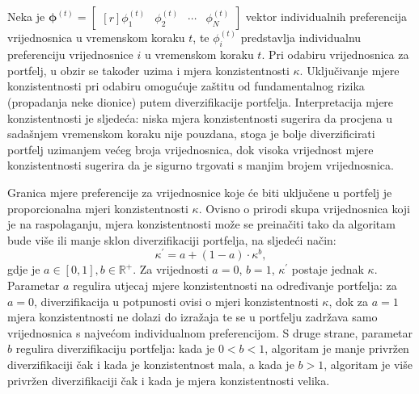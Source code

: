 \documentclass[lmodern, utf8, diplomski, numeric]{fer}
\newcommand{\matr}[1]{\mathbold{#1}}
\newcommand{\q}{\left}
\newcommand{\w}{\right}
\begin{document}
  Neka je $\matr{\phi}^{\q(t\w)} = \begin{bmatrix*}[r] \phi_1^{\q(t\w)} & \phi_2^{\q(t\w)} & \cdots & \phi_N^{\q(t\w)} \end{bmatrix*}$ vektor individualnih preferencija vrijednosnica u vremenskom koraku $t$, te $\phi_i^{\q(t\w)}$ predstavlja individualnu preferenciju vrijednosnice $i$ u vremenskom koraku $t$.
  Pri odabiru vrijednosnica za portfelj, u obzir se također uzima i mjera konzistentnosti $\kappa$.
  Uključivanje mjere konzistentnosti pri odabiru omogućuje zaštitu od fundamentalnog rizika (propadanja neke dionice) putem diverzifikacije portfelja.
  Interpretacija mjere konzistentnosti je sljedeća: niska mjera konzistentnosti sugerira da procjena u sadašnjem vremenskom koraku nije pouzdana, stoga je bolje diverzificirati portfelj uzimanjem većeg broja vrijednosnica, dok visoka vrijednost mjere konzistentnosti sugerira da je sigurno trgovati s manjim brojem vrijednosnica.
    
  Granica mjere preferencije za vrijednosnice koje će biti uključene u portfelj je proporcionalna mjeri konzistentnosti $\kappa$.
  Ovisno o prirodi skupa vrijednosnica koji je na raspolaganju, mjera konzistentnosti može se preinačiti tako da algoritam bude više ili manje sklon diverzifikaciji portfelja, na sljedeći način:
  \begin{equation}
  \kappa^\prime = a + (1 - a)\cdot \kappa^b,
  \end{equation}
  gdje je $a \in [0, 1], b \in \mathbb{R}^+$.
  Za vrijednosti $a = 0$, $b = 1$, $\kappa^\prime$ postaje jednak $\kappa$.
  Parametar $a$ regulira utjecaj mjere konzistentnosti na određivanje portfelja: za $a = 0$, diverzifikacija u potpunosti ovisi o mjeri konzistentnosti $\kappa$, dok za $a = 1$ mjera konzistentnosti ne dolazi do izražaja te se u portfelju zadržava samo vrijednosnica s najvećom individualnom preferencijom.
  S druge strane, parametar $b$ regulira diverzifikaciju portfelja: kada je $0 < b < 1$, algoritam je manje privržen diverzifikaciji čak i kada je konzistentnost mala, a kada je $b > 1$, algoritam je više privržen diverzifikaciji čak i kada je mjera konzistentnosti velika.
  
\end{document}

